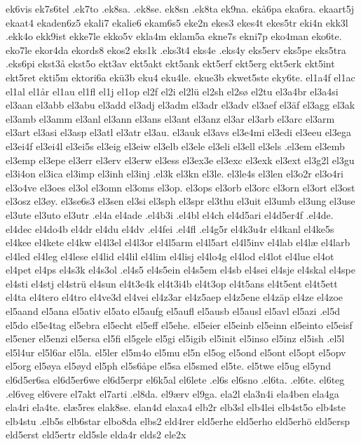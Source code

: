 ek6vis
ek7s6tel
.ek7to
.ek8sa.
.ek8se.
ek8sn
.ek8ta
ek9na.
ekå6pa
eka6ra.
ekaart5j
ekaat4
ekaden6z5
ekali7
ekalie6
ekam6s5
eke2n
ekes3
ekes4t
ekes5tr
eki4n
ekk3l
.ekk4o
ekk9ist
ekke7le
ekko5v
ekla4m
eklam5a
ekne7s
ekni7p
eko4man
eko6te.
eko7le
ekor4da
ekords8
ekos2
eks1k
.eks3t4
eks4e
.eks4y
eks5erv
eks5pe
eks5tra
.eks6pi
ekst3å
ekst5o
ekt3av
ekt5akt
ekt5ank
ekt5erf
ekt5erg
ekt5erk
ekt5int
ekt5ret
ekti5m
ektori6a
ekü3b
eku4
eku4le.
ekue3b
ekwet5ste
eky6te.
el1a4f
el1ac
el1al
el1år
el1au
el1fl
el1j
el1op
el2f
el2i
el2lü
el2sh
el2sø
el2tu
el3a4br
el3a4si
el3aan
el3abb
el3abu
el3add
el3adj
el3adm
el3adr
el3adv
el3aef
el3äf
el3agg
el3ak
el3amb
el3amm
el3anl
el3ann
el3ans
el3ant
el3anz
el3ar
el3arb
el3arc
el3arm
el3art
el3asi
el3asp
el3atl
el3atr
el3au.
el3auk
el3avs
el3e4mi
el3edi
el3eeu
el3ega
el3ei4f
el3ei4l
el3ei5s
el3eig
el3eiw
el3elb
el3ele
el3eli
el3ell
el3els
.el3em
el3emb
el3emp
el3epe
el3err
el3erv
el3erw
el3ess
el3ex3e
el3exc
el3exk
el3ext
el3g2l
el3gu
el3i4on
el3ica
el3imp
el3inh
el3inj
.el3k
el3kn
el3le.
el3le4s
el3len
el3o2r
el3o4ri
el3o4ve
el3oes
el3ol
el3omn
el3oms
el3op.
el3ops
el3orb
el3orc
el3orn
el3ort
el3ost
el3osz
el3øy.
el3se6s3
el3sen
el3si
el3sph
el3spr
el3thu
el3uit
el3umb
el3ung
el3use
el3ute
el3uto
el3utr
.el4a
el4ade
.el4b3i
.el4bl
el4ch
el4d5ari
el4d5er4f
.el4de.
el4dec
el4do4b
el4dr
el4du
el4dv
.el4fei
.el4fl
.el4g5r
el4k3u4r
el4kanl
el4ke5s
el4kee
el4kete
el4kw
el4l3el
el4l3or
el4l5arm
el4l5art
el4l5inv
el4lab
el4læ
el4larb
el4led
el4leg
el4lese
el4lid
el4lil
el4lim
el4lisj
el4lo4g
el4lod
el4lot
el4lue
el4ot
el4pet
el4ps
el4s3k
el4s3ol
.el4s5
el4s5ein
el4s5em
el4sb
el4sei
el4sje
el4skal
el4spe
el4sti
el4stj
el4strü
el4sun
el4t3e4k
el4t3i4b
el4t3op
el4t5ans
el4t5ent
el4t5ett
el4ta
el4tero
el4tro
el4ve3d
el4vei
el4z3ar
el4z5aep
el4z5ene
el4zäp
el4ze
el4zoe
el5aand
el5ana
el5ativ
el5ato
el5aufg
el5aufl
el5ausb
el5ausl
el5avl
el5azi
.el5d
el5do
el5e4tag
el5ebra
el5echt
el5eff
el5ehe.
el5eier
el5einb
el5einn
el5einto
el5eisf
el5ener
el5enzi
el5ersa
el5fi
el5gele
el5gi
el5igib
el5init
el5inso
el5inz
el5ish
.el5l
el5l4ur
el5l6ar
el5la.
el5ler
el5m4o
el5mu
el5n
el5og
el5ond
el5ont
el5opt
el5opv
el5org
el5øya
el5øyd
el5ph
el5s6åpe
el5sa
el5smed
el5te.
el5twe
el5ug
el5ynd
el6d5er6sa
el6d5er6we
el6d5erpr
el6k5al
el6lete
.el6s
el6sno
.el6ta.
.el6te.
el6teg
.el6veg
el6vere
el7akt
el7arti
.el8da.
el9ærv
el9ga.
ela2l
ela3n4i
ela4ben
ela4ga
ela4ri
ela4te.
elæ5res
elak8se.
elan4d
elaxa4
elb2r
elb3sl
elb4lei
elb4st5o
elb4ste
elb4stu
.elb5s
elb6star
elbo8da
elbs2
eld4rer
eld5erhe
eld5erho
eld5erhö
eld5ersp
eld5erst
eld5ertr
eld5sle
elda4r
elds2
ele2x
